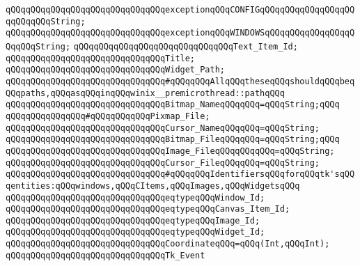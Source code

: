 \verb|qQQqqQQqqQQqqQQqqQQqqQQqqQQqqQQqexceptionqQQqCONFIGqQQqqQQqqQQqqQQqqQQqqQQqqQQqString;|\newline
\verb|qQQqqQQqqQQqqQQqqQQqqQQqqQQqqQQqexceptionqQQqWINDOWSqQQqqQQqqQQqqQQqqQQqqQQqString;|\newline
\newline
\newline
\verb|qQQqqQQqqQQqqQQqqQQqqQQqqQQqqQQqText_Item_Id;|\newline
\newline
\verb|qQQqqQQqqQQqqQQqqQQqqQQqqQQqqQQqTitle;|\newline
\verb|qQQqqQQqqQQqqQQqqQQqqQQqqQQqqQQqWidget_Path;|\newline
\newline
\newline
\verb|qQQqqQQqqQQqqQQqqQQqqQQqqQQqqQQq#qQQqqQQqAllqQQqtheseqQQqshouldqQQqbeqQQqpaths,qQQqasqQQqinqQQqwinix__premicrothread::pathqQQq|\newline
\verb|qQQqqQQqqQQqqQQqqQQqqQQqqQQqqQQqBitmap_NameqQQqqQQq=qQQqString;qQQq|\newline
\verb|qQQqqQQqqQQqqQQq#qQQqqQQqqQQqPixmap_File;|\newline
\verb|qQQqqQQqqQQqqQQqqQQqqQQqqQQqqQQqCursor_NameqQQqqQQq=qQQqString;|\newline
\verb|qQQqqQQqqQQqqQQqqQQqqQQqqQQqqQQqBitmap_FileqQQqqQQq=qQQqString;qQQq|\newline
\verb|qQQqqQQqqQQqqQQqqQQqqQQqqQQqqQQqImage_FileqQQqqQQqqQQq=qQQqString;|\newline
\verb|qQQqqQQqqQQqqQQqqQQqqQQqqQQqqQQqCursor_FileqQQqqQQq=qQQqString;|\newline
\newline
\verb|qQQqqQQqqQQqqQQqqQQqqQQqqQQqqQQq#qQQqqQQqIdentifiersqQQqforqQQqtk'sqQQqentities:qQQqwindows,qQQqCItems,qQQqImages,qQQqWidgetsqQQq|\newline
\verb|qQQqqQQqqQQqqQQqqQQqqQQqqQQqqQQqeqtypeqQQqWindow_Id;|\newline
\verb|qQQqqQQqqQQqqQQqqQQqqQQqqQQqqQQqeqtypeqQQqCanvas_Item_Id;|\newline
\verb|qQQqqQQqqQQqqQQqqQQqqQQqqQQqqQQqeqtypeqQQqImage_Id;|\newline
\verb|qQQqqQQqqQQqqQQqqQQqqQQqqQQqqQQqeqtypeqQQqWidget_Id;|\newline
\newline
\verb|qQQqqQQqqQQqqQQqqQQqqQQqqQQqqQQqCoordinateqQQq=qQQq(Int,qQQqInt);|\newline
\newline
\verb|qQQqqQQqqQQqqQQqqQQqqQQqqQQqqQQqTk_Event|\newline
